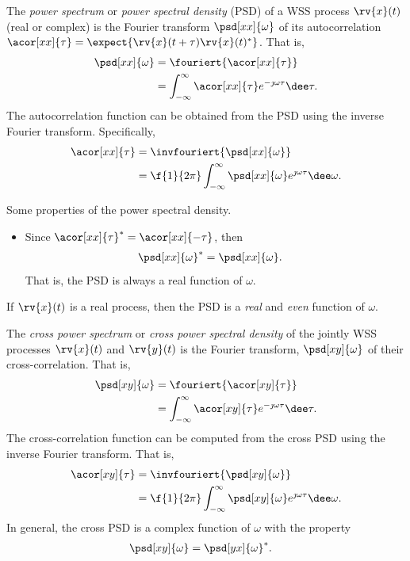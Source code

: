 \begin{definitionBox}
    The \emph{power spectrum} or \emph{power spectral density} (PSD) of a WSS process $\rv{x}(t)$ (real or complex) is the Fourier transform $\psd[xx]{\omega}$ of its autocorrelation $\acor[xx]{\tau} = \expect{\rv{x}(t+\tau)\rv{x}(t)^{\herm}}$. That is,
    \begin{align}
        \psd[xx]{\omega} &= \fouriert{\acor[xx]{\tau} }\\
        &= \int_{-\infty}^{\infty}\acor[xx]{\tau}e^{-\jmath\omega\tau}\dee\tau.
    \end{align}
    The autocorrelation function can be obtained from the PSD using the inverse Fourier transform. Specifically,
    \begin{align}
        \acor[xx]{\tau} &= \invfouriert{\psd[xx]{\omega}}\\
        &= \f{1}{2\pi} \int_{-\infty}^{\infty} \psd[xx]{\omega}e^{\jmath\omega\tau}\dee\omega.
    \end{align}
\end{definitionBox}

\begin{remarkBox}
    Some properties of the power spectral density.
    \begin{itemize}
        \item Since $\acor[xx]{\tau}^{\herm} = \acor[xx]{-\tau}$, then 
        \begin{align}
            \psd[xx]{\omega}^{\herm} &= \psd[xx]{\omega}.
        \end{align}
        That is, the PSD is always a real function of $\omega$.
    \end{itemize}
    \item If $\rv{x}(t)$ is a real process, then the PSD is a \emph{real} and \emph{even} function of $\omega$.
\end{remarkBox}


\begin{definitionBox}
    The \emph{cross power spectrum} or \emph{cross power spectral density} of the jointly WSS processes $\rv{x}(t)$ and $\rv{y}(t)$ is the Fourier transform, $\psd[xy]{\omega}$ of their cross-correlation. That is,
    \begin{align}
        \psd[xy]{\omega} &= \fouriert{\acor[xy]{\tau}}\\
        &= \int_{-\infty}^{\infty} \acor[xy]{\tau}e^{-\jmath\omega\tau}\dee\tau.
    \end{align}
    The cross-correlation function can be computed from the cross PSD using the inverse Fourier transform. That is,
    \begin{align}
        \acor[xy]{\tau} &= \invfouriert{\psd[xy]{\omega}}\\
        &= \f{1}{2\pi}\int_{-\infty}^{\infty}\psd[xy]{\omega}e^{\jmath\omega\tau}\dee\omega.
    \end{align}
    In general, the cross PSD is a complex function of $\omega$ with the property
    \begin{align}
        \psd[xy]{\omega} &= \psd[yx]{\omega}^{\herm}.
    \end{align}
\end{definitionBox}


